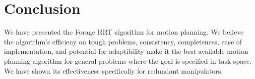 \documentclass[conference]{IEEEtran}
\begin{document}
\section{Conclusion}
We have presented the Forage RRT algorithm for motion planning. We believe the algorithm's efficieny on tough problems, consistency,
completeness, ease of implementation, and potential for adaptibility make it the best available motion planning algorithm for general
problems where the goal is specified in task space. We have shown its effectiveness specifically for redundant manipulators.



\end{document}

